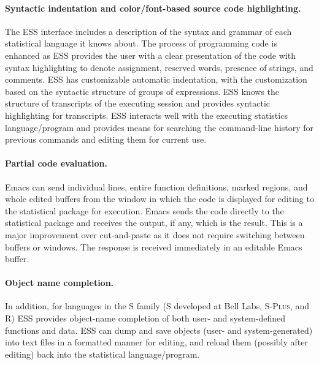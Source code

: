 \documentclass{article}
\newcommand*{\Splus}{\textsc{S-Plus}}
\begin{document}
\paragraph{Syntactic indentation and color/font-based source code
  highlighting.}  The ESS interface includes a description of the
syntax and grammar of each statistical language it knows about.
The process of programming code is enhanced as ESS provides the user with
a clear presentation of the code with syntax highlighting to denote
assignment, reserved words, presence of strings, and comments.  ESS
has customizable automatic indentation, with the customization based
on the syntactic structure of groups of expressions.  
ESS knows the
structure of transcripts of the executing session and provides
syntactic highlighting for transcripts.  ESS interacts well with the
executing statistics language/program and provides means for searching
the command-line history for previous commands and editing them for
current use.

\paragraph{Partial code evaluation.}
Emacs can send individual lines, entire function definitions, marked
regions, and whole edited buffers from the window in which the code is
displayed for editing to the statistical package for
execution.  
Emacs sends the code directly to
the statistical package and receives the output, if any, which is 
the result.  This is a major improvement over cut-and-paste as it does
not require switching between buffers or windows.  The response is received
immediately in an editable Emacs buffer.

\paragraph{Object name completion.}
In addition, for languages in the S family (S developed at Bell Labs,
\Splus, and R) ESS provides object-name completion of both user- and
system-defined functions and data.  ESS can dump and save objects
(user- and system-generated) into text files in a formatted manner for
editing, and reload them (possibly after editing) back into the
statistical language/program.
\end{document}
